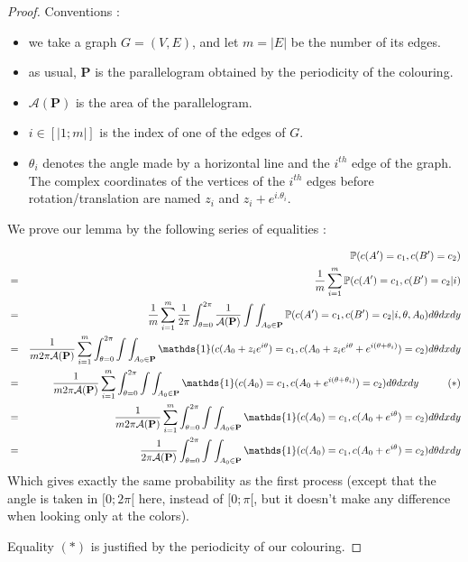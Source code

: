 \documentclass[a4paper,11pt]{article}
\theoremstyle{definition}
\theoremstyle{remark}
\begin{document}
\begin{proof}
Conventions : 
\begin{itemize}
\item we take a graph $G=(V,E)$, and let $m = |E|$ be the number of its edges.

\item as usual, $\mathbf{P}$ is the parallelogram obtained by the periodicity 
of the colouring.

\item $\mathcal{A}(\mathbf{P})$ is the area of the parallelogram.

\item $i \in [|1;m|]$ is the index of one of the edges of $G$.

\item $\theta_i$ denotes the angle made by a horizontal line and the $i^{th}$ 
edge of the graph. The 
complex coordinates of the vertices of the $i^{th}$ edges before 
rotation/translation are named $z_i $ and $z_i + e^{i.\theta_i}$.

\end{itemize}

We prove our lemma by the following series of equalities :

\begin{eqnarray*}
& & \mathbb{P}(c(A') = c_1, c(B') = c_2) \\
  &=& \frac{1}{m}\sum_{i=1}^{m} \mathbb{P}(c(A') = c_1, c(B') = c_2 | i)  \\
  &=& \frac{1}{m}\sum_{i=1}^{m}  \frac{1}{2\pi}\int_{\theta =0} ^{2\pi} \frac{1}{\mathcal{A}(\mathbf{P})}\int\int_{A_0 \in \mathbf{P}} \mathbb{P}(c(A') = c_1, c(B') = c_2 | i, \theta, A_0) d\theta dx dy \\  
  &=& \frac{1}{m 2\pi \mathcal{A}(\mathbf {P})}\sum_{i=1}^{m}\int_{\theta =0} ^{2\pi} \int\int_{A_0 \in \mathbf{P}} \mathds{1}(c(A_0 + z_i e^{i\theta}) = c_1, c(A_0 +z_i e^{i\theta} + e^{i (\theta + \theta_i)}) = c_2) d\theta dx dy \\  
    &=& \frac{1}{m 2\pi \mathcal{A}(\mathbf{P})}\sum_{i=1}^{m} \int_{\theta =0} ^{2\pi} \int\int_{A_0 \in \mathbf{P}} \mathds{1}(c(A_0) = c_1, c(A_0 + e^{i (\theta + \theta_i)}) = c_2 ) d\theta dx dy \hspace{1 cm} (*)\\ 
    &=& \frac{1}{m 2\pi \mathcal{A}(\mathbf{P})}\sum_{i=1}^{m} \int_{\theta =0} ^{2\pi} \int\int_{A_0 \in \mathbf{P}} \mathds{1}(c(A_0) = c_1, c(A_0 + e^{i \theta}) = c_2 ) d\theta dx dy \\ 
    &=& \frac{1}{2\pi \mathcal{A}(\mathbf{P})}\int_{\theta =0} ^{2\pi} \int\int_{A_0 \in \mathbf{P}} \mathds{1}(c(A_0) = c_1, c(A_0 + e^{i \theta}) = c_2 ) d\theta dx dy \\ 
\end{eqnarray*}
Which gives exactly the same probability as the first process (except that the 
angle is taken in $[0;2\pi[$ here, instead of $[0;\pi[$, but it doesn't make 
any difference when looking only at the colors).

Equality $(*)$ is justified by the periodicity of our colouring.
\end{proof}
\end{document}
